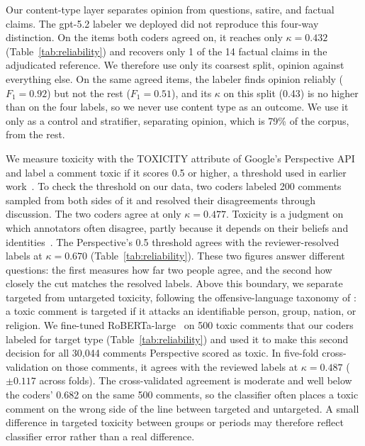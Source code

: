 

Our content-type layer separates opinion from questions, satire, and factual claims. The gpt-5.2 labeler we deployed did not reproduce this four-way distinction. On the items both coders agreed on, it reaches only $\kappa = 0.432$ (Table~\ref{tab:reliability}) and recovers only 1 of the 14 factual claims in the adjudicated reference. We therefore use only its coarsest split, opinion against everything else. On the same agreed items, the labeler finds opinion reliably ($F_1 = 0.92$) but not the rest ($F_1 = 0.51$), and its $\kappa$ on this split (0.43) is no higher than on the four labels, so we never use content type as an outcome. We use it only as a control and stratifier, separating opinion, which is 79\% of the corpus, from the rest.

We measure toxicity with the TOXICITY attribute of Google's Perspective API~\cite{jigsaw2018perspective,lees2022perspective} and label a comment toxic if it scores 0.5 or higher, a threshold used in earlier work~\cite{rajadesingan2020norms,trujillo2022reddit,saveski2021structure,aleksandric2025power,kumarswamy2025causal}. To check the threshold on our data, two coders labeled 200 comments sampled from both sides of it and resolved their disagreements through discussion. The two coders agree at only $\kappa = 0.477$. Toxicity is a judgment on which annotators often disagree, partly because it depends on their beliefs and identities~\cite{sap2022annotators,davani2022dealing}. The Perspective's 0.5 threshold agrees with the reviewer-resolved labels at $\kappa = 0.670$ (Table~\ref{tab:reliability}). These two figures answer different questions: the first measures how far two people agree, and the second how closely the cut matches the resolved labels. Above this boundary, we separate targeted from untargeted toxicity, following the offensive-language taxonomy of \citet{zampieri2019olid}: a toxic comment is targeted if it attacks an identifiable person, group, nation, or religion. We fine-tuned RoBERTa-large~\cite{liu2019roberta} on 500 toxic comments that our coders labeled for target type (Table~\ref{tab:reliability}) and used it to make this second decision for all 30,044 comments Perspective scored as toxic. In five-fold cross-validation on those comments, it agrees with the reviewed labels at $\kappa = 0.487$ ($\pm 0.117$ across folds). The cross-validated agreement is moderate and well below the coders' 0.682 on the same 500 comments, so the classifier often places a toxic comment on the wrong side of the line between targeted and untargeted. A small difference in targeted toxicity between groups or periods may therefore reflect classifier error rather than a real difference.

